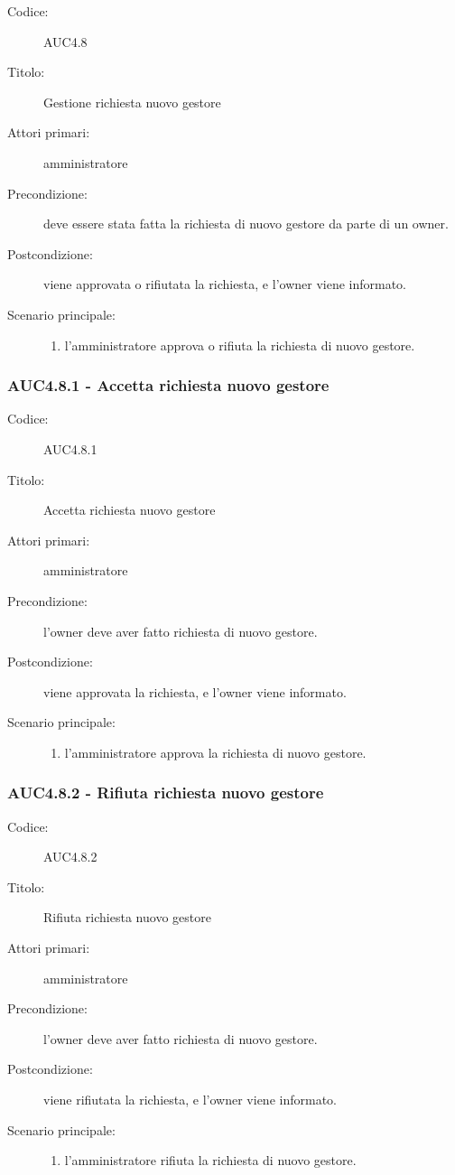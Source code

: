 \documentclass[casi-duso]{subfiles}
\begin{document}
\begin{description}
  \item[Codice:] AUC4.8
  \item[Titolo:] Gestione richiesta nuovo gestore
  \item[Attori primari:] amministratore
  \item[Precondizione:] deve essere stata fatta la richiesta di nuovo gestore da parte di un owner.
  \item[Postcondizione:] viene approvata o rifiutata la richiesta, e l'owner viene informato.
  \item[Scenario principale:]
  \begin{enumerate}
    \item l'amministratore approva o rifiuta la richiesta di nuovo gestore.
  \end{enumerate}
\end{description}

\subsubsection{AUC4.8.1 - Accetta richiesta nuovo gestore}%
\label{subsub:AUC4.8.1}
\begin{description}
  \item[Codice:] AUC4.8.1
  \item[Titolo:] Accetta richiesta nuovo gestore
  \item[Attori primari:] amministratore
  \item[Precondizione:] l'owner deve aver fatto richiesta di nuovo gestore.
  \item[Postcondizione:] viene approvata la richiesta, e l'owner viene informato.
  \item[Scenario principale:]
  \begin{enumerate}
    \item l'amministratore approva la richiesta di nuovo gestore.
  \end{enumerate}
\end{description}  

\subsubsection{AUC4.8.2 - Rifiuta richiesta nuovo gestore}%
\label{subsub:AUC4.8.2}
\begin{description}
  \item[Codice:] AUC4.8.2
  \item[Titolo:] Rifiuta richiesta nuovo gestore
  \item[Attori primari:] amministratore
  \item[Precondizione:] l'owner deve aver fatto richiesta di nuovo gestore.
  \item[Postcondizione:] viene rifiutata la richiesta, e l'owner viene informato.
  \item[Scenario principale:]
  \begin{enumerate}
    \item l'amministratore rifiuta la richiesta di nuovo gestore.
  \end{enumerate}
\end{description}  
\end{document}
